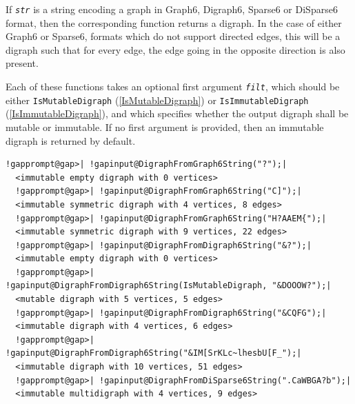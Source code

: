 \documentclass[a4paper,11pt]{report}
\begin{document}
{{{ If \mbox{\texttt{\mdseries\slshape str}} is a string encoding a graph in Graph6, Digraph6, Sparse6 or DiSparse6 format,
then the corresponding function returns a digraph. In the case of either
Graph6 or Sparse6, formats which do not support directed edges, this will be a
digraph such that for every edge, the edge going in the opposite direction is
also present.

 Each of these functions takes an optional first argument \mbox{\texttt{\mdseries\slshape filt}}, which should be either \texttt{IsMutableDigraph} (\ref{IsMutableDigraph}) or \texttt{IsImmutableDigraph} (\ref{IsImmutableDigraph}), and which specifies whether the output digraph shall be mutable or
immutable. If no first argument is provided, then an immutable digraph is
returned by default. 
\begin{Verbatim}[commandchars=!@|,fontsize=\small,frame=single,label=Example]
  !gapprompt@gap>| !gapinput@DigraphFromGraph6String("?");|
  <immutable empty digraph with 0 vertices>
  !gapprompt@gap>| !gapinput@DigraphFromGraph6String("C]");|
  <immutable symmetric digraph with 4 vertices, 8 edges>
  !gapprompt@gap>| !gapinput@DigraphFromGraph6String("H?AAEM{");|
  <immutable symmetric digraph with 9 vertices, 22 edges>
  !gapprompt@gap>| !gapinput@DigraphFromDigraph6String("&?");|
  <immutable empty digraph with 0 vertices>
  !gapprompt@gap>| !gapinput@DigraphFromDigraph6String(IsMutableDigraph, "&DOOOW?");|
  <mutable digraph with 5 vertices, 5 edges>
  !gapprompt@gap>| !gapinput@DigraphFromDigraph6String("&CQFG");|
  <immutable digraph with 4 vertices, 6 edges>
  !gapprompt@gap>| !gapinput@DigraphFromDigraph6String("&IM[SrKLc~lhesbU[F_");|
  <immutable digraph with 10 vertices, 51 edges>
  !gapprompt@gap>| !gapinput@DigraphFromDiSparse6String(".CaWBGA?b");|
  <immutable multidigraph with 4 vertices, 9 edges>
\end{Verbatim}
 }

 

}}
\end{document}
